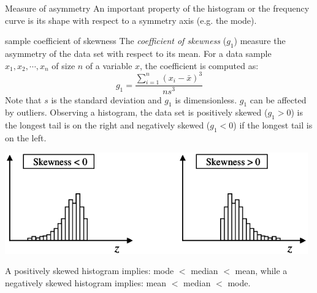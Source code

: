 \documentclass[8pt]{beamer}
\begin{document}
\begin{frame}{Measure of asymmetry}
    An important property of the histogram or the frequency curve  is its shape with respect to a symmetry axis (e.g. the mode).

    \begin{block}{sample coefficient of skewness}
        The \emph{coefficient of skewness} ($g_1$) measure the asymmetry of the data set with respect to its mean. For a data sample $x_1, x_2, \cdots, x_n$ of size $n$ of a variable $x$, the coefficient is computed as:
        $$
        g_1 = \frac{\sum_{i=1}^n \left(x_i - \bar{x} \right)^3}{n s^3}
        $$
        Note that $s$ is the standard deviation and $g_1$ is dimensionless. $g_1$ can be affected by outliers. Observing a histogram, the data set is positively skewed ($g_1 > 0$)  is the longest tail is on the right and negatively skewed ($g_1 < 0$) if the longest tail is on the left. 

        \vspace{-0.1cm}
        \begin{center}
        \includegraphics[width=0.98\textwidth]{fiBi26.png}
        \vspace{-0.3cm}
        \end{center}
        \vspace{-0.3cm}
        A positively skewed histogram implies: mode $<$ median $<$ mean,  while a negatively skewed histogram implies: mean $<$ median $<$ mode.
    \end{block}
\end{frame}
\end{document}
